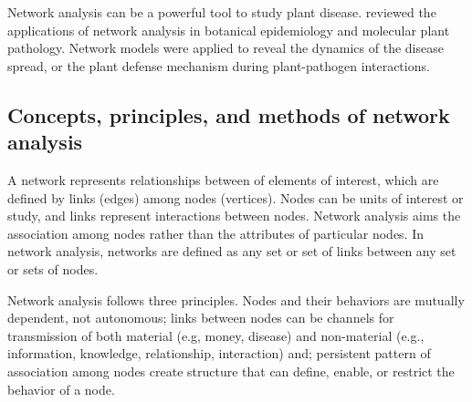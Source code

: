 Network analysis can be a powerful tool to study plant disease.  reviewed the applications of network analysis in botanical epidemiology and molecular plant pathology. Network models were applied to reveal the dynamics of the disease spread, or the plant defense mechanism during plant-pathogen interactions.

\subsection*{Concepts, principles, and methods of network analysis}

A network represents relationships between of elements of interest, which are defined by links (edges) among nodes (vertices). Nodes can be units of interest or study, and links represent interactions between nodes. Network analysis aims the association among nodes rather than the attributes of particular nodes. In network analysis, networks are defined as any set or set of links between any set or sets of nodes.

Network analysis follows three principles. Nodes and their behaviors are mutually dependent, not autonomous; links between nodes can be channels for transmission of both material (e.g, money, disease) and non-material (e.g., information, knowledge, relationship, interaction) and; persistent pattern of association among nodes create structure that can define, enable, or restrict the behavior of a node.  

